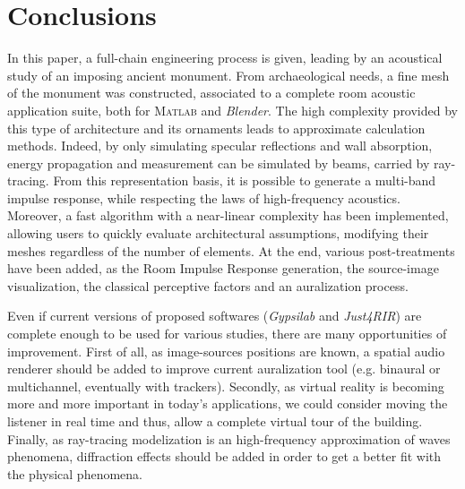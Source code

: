 \documentclass{aes2e}
\begin{document}
\begin{table}[h]
 \end{table}

\section{Conclusions}

In this paper, a full-chain engineering process is given, leading by an acoustical study of an imposing ancient monument. From archaeological needs, a fine mesh of the monument was constructed, associated to a complete room acoustic application suite, both for \textsc{Matlab} and \textit{Blender}. The high complexity provided by this type of architecture and its ornaments leads to approximate calculation methods. Indeed, by only simulating specular reflections and wall absorption, energy propagation and measurement can be simulated by beams, carried by ray-tracing. From this representation basis, it is possible to generate a multi-band impulse response, while respecting the laws of high-frequency acoustics. Moreover, a fast algorithm with a near-linear complexity has been implemented, allowing users to quickly evaluate architectural assumptions, modifying their meshes regardless of the number of elements. At the end, various post-treatments have been added, as the Room Impulse Response generation, the source-image visualization, the classical perceptive factors and an auralization process.

Even if current versions of proposed softwares (\textit{Gypsilab} \cite{githubGypsi} and \textit{Just4RIR}) are complete enough to be used for various studies, there are many opportunities of improvement. First of all, as image-sources positions are known, a spatial audio renderer should be added to improve current auralization tool (e.g. binaural or multichannel, eventually with trackers). Secondly, as virtual reality is becoming more and more important in today's applications, we could consider moving the listener in real time and thus, allow a complete virtual tour of the building. Finally, as ray-tracing modelization is an high-frequency approximation of waves phenomena, diffraction effects should be added in order to get a better fit with the physical phenomena. 
\end{document}

